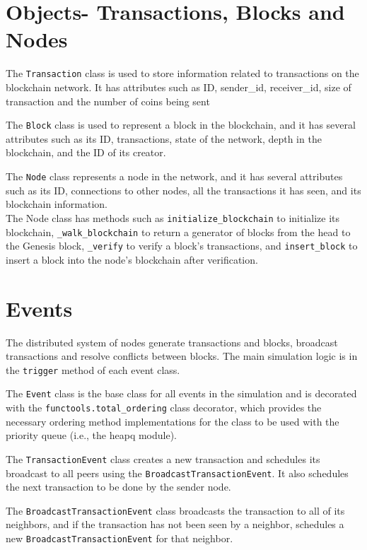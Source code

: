 \documentclass[a4paper,14pt]{article}
\begin{document}
\section{Objects- Transactions, Blocks and Nodes}

The \verb|Transaction| class is used to store information related to transactions on the blockchain network. It has attributes such as ID, sender\_id, receiver\_id, size of transaction and the number of coins being sent

The \verb|Block| class is used to represent a block in the blockchain, and it has several attributes such as its ID, transactions, state of the network, depth in the blockchain, and the ID of its creator.

The \verb|Node| class represents a node in the network, and it has several attributes such as its ID, connections to other nodes, all the transactions it has seen, and its blockchain information. \\
The Node class has methods such as \verb|initialize_blockchain| to initialize its blockchain, \verb|_walk_blockchain| to return a generator of blocks from the head to the Genesis block, \verb|_verify| to verify a block's transactions, and \verb|insert_block| to insert a block into the node's blockchain after verification.

\section{Events}

The distributed system of nodes generate transactions and blocks, broadcast transactions and resolve conflicts between blocks. The main simulation logic is in the \verb|trigger| method of each event class.

The \verb|Event| class is the base class for all events in the simulation and is decorated with the \verb|functools.total_ordering| class decorator, which provides the necessary ordering method implementations for the class to be used with the priority queue (i.e., the heapq module).

The \verb|TransactionEvent| class creates a new transaction and schedules its broadcast to all peers using the \verb|BroadcastTransactionEvent|. It also schedules the next transaction to be done by the sender node.

The \verb|BroadcastTransactionEvent| class broadcasts the transaction to all of its neighbors, and if the transaction has not been seen by a neighbor, schedules a new \verb|BroadcastTransactionEvent| for that neighbor.
\end{document}
